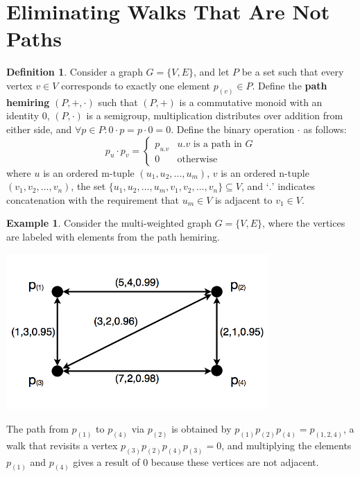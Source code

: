\documentclass[12pt]{amsart}
\theoremstyle{definition}
\newtheorem{definition}[thm]{Definition}
\newtheorem{example}[thm]{Example}
\theoremstyle{remark}
\numberwithin{equation}{section}
\begin{document}
\section{Eliminating Walks That Are Not Paths}

\begin{definition}
Consider a graph $G = \{V,E\}$, and let $P$ be a set such that every vertex $v \in V$ corresponds to exactly one element $p_{(v)} \in P$. Define the \textbf{path hemiring} $(P,+,\cdot)$ such that $(P,+)$ is a commutative monoid with an identity $0$, $(P,\cdot)$ is a semigroup, multiplication distributes over addition from either side, and $\forall p \in P : 0 \cdot p = p \cdot 0 = 0$. Define the binary operation $\cdot$ as follows:
$$
	p_{u} \cdot p_{v}  = \left\{
		\begin{array}{ll}
			p_{u.v} & u.v \text{ is a path in } G \\
			0             & \text{otherwise}
		\end{array}
	\right.
$$
where $u$ is an ordered m-tuple $(u_1, u_2, \ldots, u_m)$, $v$ is an ordered n-tuple $(v_1, v_2, \ldots, v_n)$, the set $\{u_1, u_2, \ldots, u_m, v_1, v_2, \ldots, v_n\} \subseteq V$, and `$.$' indicates concatenation with the requirement that $u_m \in V$ is adjacent to $v_1 \in V$.
\end{definition}

\begin{example}
Consider the multi-weighted graph $G = \{V,E\}$, where the vertices are labeled with elements from the path hemiring.

\begin{center}\includegraphics[width=10cm]{figure-7.png}\end{center}

The path from $p_{(1)}$ to $p_{(4)}$ via $p_{(2)}$ is obtained by $p_{(1)}p_{(2)}p_{(4)} = p_{(1,2,4)}$, a walk that revisits a vertex $p_{(3)}p_{(2)}p_{(4)}p_{(3)} = 0$, and multiplying the elements $p_{(1)}$ and $p_{(4)}$ gives a result of $0$ because these vertices are not adjacent.
\end{example}
\end{document}
